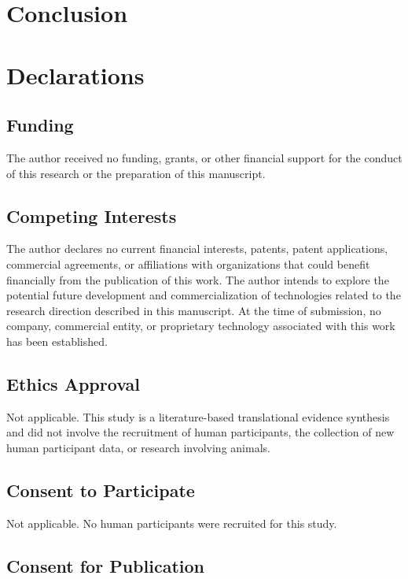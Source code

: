 \documentclass[pdflatex,sn-basic]{sn-jnl}
\theoremstyle{thmstyleone}
\theoremstyle{thmstyletwo}
\begin{document}
\section{Conclusion}



\section*{Declarations}

\subsection*{Funding}

The author received no funding, grants, or other financial support for the
conduct of this research or the preparation of this manuscript.


\subsection*{Competing Interests}

The author declares no current financial interests, patents, patent applications,
commercial agreements, or affiliations with organizations that could benefit
financially from the publication of this work. The author intends to explore
the potential future development and commercialization of technologies related
to the research direction described in this manuscript. At the time of
submission, no company, commercial entity, or proprietary technology associated
with this work has been established.


\subsection*{Ethics Approval}

Not applicable. This study is a literature-based translational evidence
synthesis and did not involve the recruitment of human participants, the
collection of new human participant data, or research involving animals.


\subsection*{Consent to Participate}

Not applicable. No human participants were recruited for this study.


\subsection*{Consent for Publication}
\end{document}
